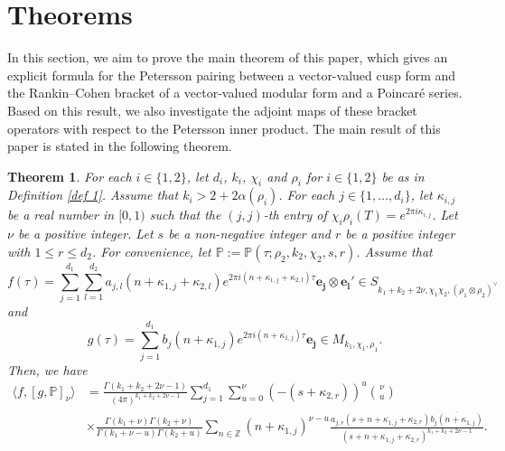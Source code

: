 \documentclass[11pt]{amsart}
\newtheorem{thm}{Theorem}[section]
\theoremstyle{definition}
\theoremstyle{remark}
\numberwithin{equation}{section}
\renewcommand{\(}{\left(}
\renewcommand{\)}{\right)}
\begin{document}
\section{Theorems}\label{s : Thm}

In this section, we aim to prove the main theorem of this paper, which gives an explicit formula for the Petersson pairing between a vector-valued cusp form and the Rankin–Cohen bracket of a vector-valued modular form and a Poincaré series.
Based on this result, we also investigate the adjoint maps of these bracket operators with respect to the Petersson inner product.
The main result of this paper is stated in the following theorem.

\begin{thm}\label{thm 3}
    For each $i\in \{1,2\}$, let $d_i$, $k_i$, $\chi_i$ and $\rho_i$ for $i\in \{1,2\}$ be as in Definition \ref{def 1}.
    Assume that $k_i>2+2\alpha(\rho_i)$.
    For each $j\in \{1,\dots,d_i\}$, let $\kappa_{i,j}$ be a real number in $[0,1)$ such that the $(j,j)$-th entry of $\chi_i\rho_i\left(T\right)=e^{2\pi i \kappa_{i,j}}$.
    Let $\nu$ be a positive integer. 
    Let $s$ be a non-negative integer and $r$ be a positive integer with $1\leq r\leq d_2$.
    For convenience, let $\mathbb{P}:=\mathbb{P}(\tau;\rho_2,k_2,\chi_2,s,r)$. 
    Assume that 
    \[f(\tau)=\sum_{j=1}^{d_1}\sum_{l=1}^{d_2} a_{j,l}(n+\kappa_{1,j}+\kappa_{2,l})e^{2 \pi i(n+\kappa_{1,j}+\kappa_{2,l})\tau}\mathbf{e_j}\otimes \mathbf{e_l'}\in S_{k_1+k_2+2\nu,\chi_1\chi_2,(\rho_1\otimes \rho_2)^{\vee}}\] 
    and 
    \[g(\tau)=\sum_{j=1}^{d_1}b_j(n+\kappa_{1,j}) e^{2\pi i (n+\kappa_{1,j})\tau} \mathbf{e_j}\in M_{k_1,\chi_1,\rho_1}.\]
    Then, we have 
    \begin{equation*}
        \begin{aligned}
            \langle f, [g,\mathbb{P}]_{\nu} \rangle &= \frac{\Gamma(k_1+k_2+2\nu-1)}{(4\pi)^{k_1+k_2+2\nu-1}}\sum_{j=1}^{d_1}\sum_{u=0}^{\nu} (-(s+\kappa_{2,r}))^{u}\binom{\nu}{u}\\
            &\times\frac{\Gamma(k_1+\nu)\Gamma(k_2+\nu)}{\Gamma(k_1+\nu-u)\Gamma(k_2+u)}\sum_{n\in \mathbb{Z}} (n+\kappa_{1,j})^{\nu-u}\frac{a_{j,r}(s+n+\kappa_{1,j}+\kappa_{2,r})\overline{b_j(n+\kappa_{1,j})}}{(s+n+\kappa_{1,j}+\kappa_{2,r})^{k_1+k_2+2\nu-1}}.
        \end{aligned}
    \end{equation*}
\end{thm}
\end{document}
